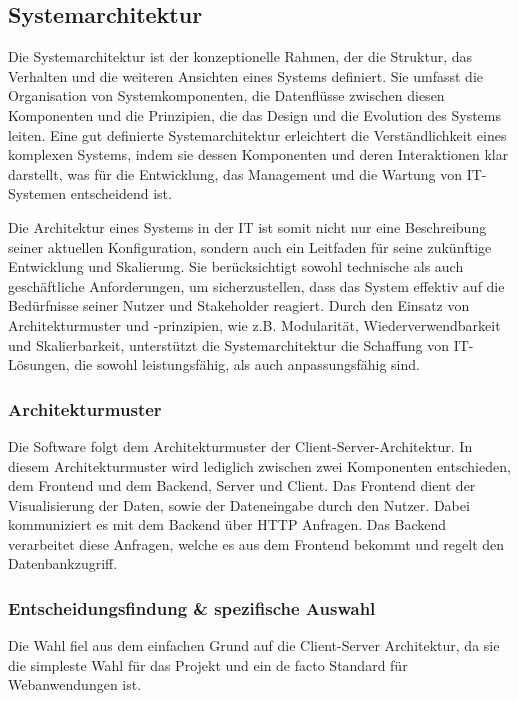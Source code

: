 \documentclass[../main.tex]{subfiles}
\begin{document}
\subsection{Systemarchitektur}

Die Systemarchitektur ist der konzeptionelle Rahmen, der die Struktur, das Verhalten und die weiteren Ansichten eines Systems definiert.
Sie umfasst die Organisation von Systemkomponenten, die Datenflüsse zwischen diesen Komponenten und die Prinzipien, die das Design und
die Evolution des Systems leiten. Eine gut definierte Systemarchitektur erleichtert die Verständlichkeit eines komplexen Systems, indem
sie dessen Komponenten und deren Interaktionen klar darstellt, was für die Entwicklung, das Management und die Wartung von IT-Systemen
entscheidend ist.

Die Architektur eines Systems in der IT ist somit nicht nur eine Beschreibung seiner aktuellen Konfiguration, sondern auch ein Leitfaden für
seine zukünftige Entwicklung und Skalierung. Sie berücksichtigt sowohl technische als auch geschäftliche Anforderungen, um sicherzustellen,
dass das System effektiv auf die Bedürfnisse seiner Nutzer und Stakeholder reagiert. Durch den Einsatz von Architekturmuster und -prinzipien,
wie z.B. Modularität, Wiederverwendbarkeit und Skalierbarkeit, unterstützt die Systemarchitektur die Schaffung von IT-Lösungen, die sowohl
leistungsfähig, als auch anpassungsfähig sind.

\subsubsection{Architekturmuster}

Die Software folgt dem Architekturmuster der Client-Server-Architektur. In diesem Architekturmuster wird lediglich zwischen zwei Komponenten
entschieden, dem Frontend und dem Backend, Server und Client. Das Frontend dient der Visualisierung der Daten, sowie der Dateneingabe durch den
Nutzer. Dabei kommuniziert es mit dem Backend über HTTP Anfragen. Das Backend verarbeitet diese Anfragen, welche es aus dem Frontend bekommt
und regelt den Datenbankzugriff.

\subsubsection{Entscheidungsfindung \& spezifische Auswahl}

Die Wahl fiel aus dem einfachen Grund auf die Client-Server Architektur, da sie die simpleste Wahl für das Projekt und ein de facto Standard für
Webanwendungen ist.
\end{document}
